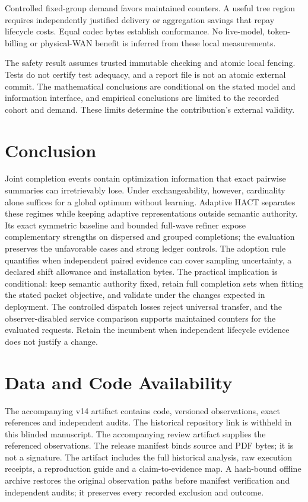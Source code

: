 \documentclass[preprint,12pt]{elsarticle}
\theoremstyle{definition}\newtheorem{definition}[theorem]{Definition}
\begin{document}
Controlled fixed-group demand favors maintained counters. A useful tree
region requires independently justified delivery or aggregation savings
that repay lifecycle costs. Equal codec bytes establish conformance.
No live-model, token-billing or physical-WAN benefit is inferred from
these local measurements.

The safety result assumes trusted immutable checking and atomic local
fencing. Tests do not certify test adequacy, and a report file is not an
atomic external commit. The mathematical conclusions are conditional on the stated model and
information interface, and empirical conclusions are limited to the recorded
cohort and demand. These limits determine the contribution's external validity.

\section{Conclusion}
Joint completion events contain optimization information that exact pairwise
summaries can irretrievably lose. Under exchangeability, however, cardinality
alone suffices for a global optimum without learning. Adaptive HACT separates
these regimes while keeping adaptive representations outside semantic
authority. Its exact symmetric baseline and bounded full-wave refiner expose
complementary strengths on dispersed and grouped completions; the evaluation
preserves the unfavorable cases and strong ledger controls.
The adoption rule quantifies when independent paired evidence can cover
sampling uncertainty, a declared shift allowance and installation bytes.
The practical implication is conditional: keep semantic authority fixed,
retain full completion sets when fitting the stated packet objective, and
validate under the changes expected in deployment. The controlled dispatch
losses reject universal transfer, and the observer-disabled service comparison
supports maintained counters for the evaluated requests. Retain the incumbent
when independent lifecycle evidence does not justify a change.

\section*{Data and Code Availability}
The accompanying v14 artifact contains code, versioned observations,
exact references and independent audits. The historical repository link is withheld in this blinded manuscript.
The accompanying review artifact supplies the referenced observations.
The release manifest binds source and PDF bytes; it is not a signature.
The artifact includes the full historical analysis, raw execution receipts,
a reproduction guide and a claim-to-evidence map. A hash-bound offline
archive restores the original observation paths before manifest verification
and independent audits; it preserves every recorded exclusion and outcome.
\end{document}
